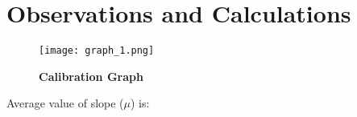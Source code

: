 \section{Observations and Calculations}
	

	\begin{figure}[H]
		\centering
		\texttt{[image: graph\_1.png]}
		\caption{\textbf{Calibration Graph}}
		\label{graph:1}
	\end{figure}

	Average value of slope ($\mu$) is:






		





